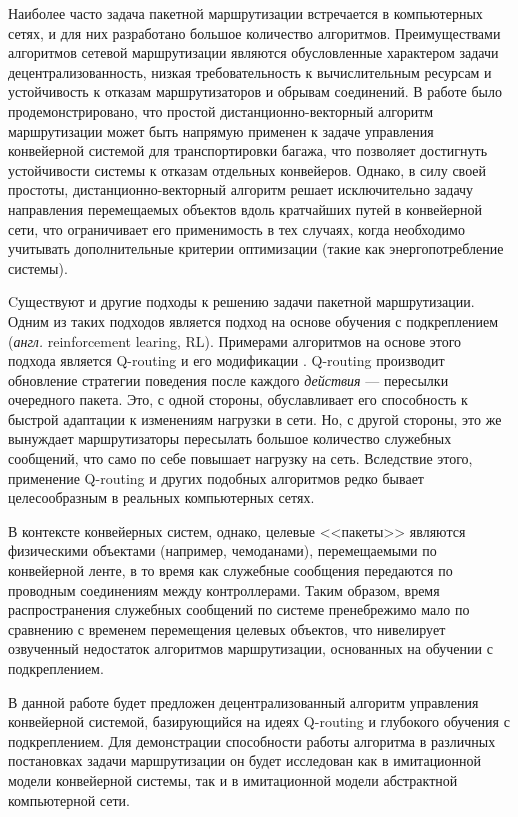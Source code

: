 \documentclass[specification,annotation,times]{itmo-student-thesis}
\theoremstyle{definition}
\begin{document}
Наиболее часто задача пакетной маршрутизации встречается в компьютерных сетях, и
для них разработано большое количество алгоритмов. Преимуществами алгоритмов
сетевой маршрутизации являются обусловленные характером задачи
децентрализованность, низкая требовательность к вычислительным ресурсам и
устойчивость к отказам маршрутизаторов и обрывам
соединений. В работе \cite{vyatkin-controllers} было продемонстрировано, что
простой дистанционно-векторный алгоритм маршрутизации может быть напрямую
применен к задаче управления конвейерной системой для транспортировки багажа,
что позволяет достигнуть устойчивости системы к отказам отдельных конвейеров.
Однако, в силу своей простоты, дистанционно-векторный алгоритм решает
исключительно задачу направления перемещаемых объектов вдоль кратчайших путей в
конвейерной сети, что ограничивает его применимость в тех случаях, когда
необходимо учитывать дополнительные критерии оптимизации (такие как
энергопотребление системы).

Cуществуют и другие подходы к решению задачи пакетной маршрутизации. Одним из
таких подходов является подход на основе обучения с подкреплением
(\textit{англ.} reinforcement learing, RL). Примерами алгоритмов на основе этого
подхода является Q-routing \cite{q-routing-orig} и его модификации
\cite{predictive-q-routing, dual-q-routing}. Q-routing производит обновление
стратегии поведения после каждого \textit{действия} --- пересылки очередного
пакета. Это, с одной стороны, обуславливает его способность к быстрой адаптации
к изменениям нагрузки в сети. Но, с другой стороны, это же вынуждает
маршрутизаторы пересылать большое количество служебных сообщений, что само по
себе повышает нагрузку на сеть. Вследствие этого, применение Q-routing и других
подобных алгоритмов редко бывает целесообразным в реальных компьютерных сетях.

В контексте конвейерных систем, однако, целевые <<пакеты>> являются физическими
объектами (например, чемоданами), перемещаемыми по конвейерной ленте, в то время
как служебные сообщения передаются по проводным соединениям между контроллерами.
Таким образом, время распространения служебных сообщений по системе пренебрежимо
мало по сравнению с временем перемещения целевых объектов, что нивелирует
озвученный недостаток алгоритмов маршрутизации, основанных на обучении с
подкреплением.

В данной работе будет предложен децентрализованный алгоритм управления
конвейерной системой, базирующийся на идеях Q-routing и глубокого обучения с
подкреплением. Для демонстрации способности работы алгоритма в различных
постановках задачи маршрутизации он будет исследован как в имитационной модели
конвейерной системы, так и в имитационной модели абстрактной компьютерной сети.
\end{document}
